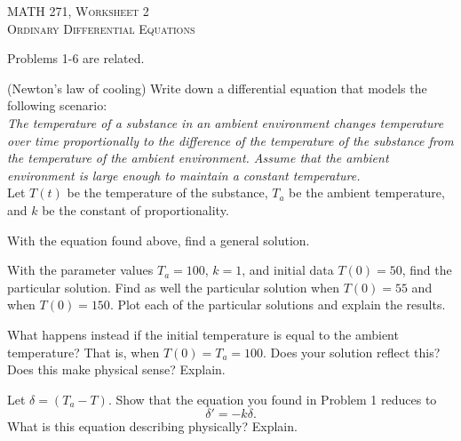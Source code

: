\documentclass[12pt]{article} %
\begin{document}
\begin{center}
   \textsc{\large MATH 271, Worksheet 2}\\
   \textsc{Ordinary Differential Equations}
\end{center}
\vspace{.5cm}

\begin{center}
    Problems 1-6 are related.
\end{center}

\begin{problem}
    (Newton's law of cooling) Write down a differential equation that models the following scenario:\\
    
    \noindent\emph{The temperature of a substance in an ambient environment changes temperature over time proportionally to the difference of the temperature of the substance from the temperature of the ambient environment. Assume that the ambient environment is large enough to maintain a constant temperature.}\\
    
    \noindent Let $T(t)$ be the temperature of the substance, $T_a$ be the ambient temperature, and $k$ be the constant of proportionality.
\end{problem}

\begin{problem}
    With the equation found above, find a general solution.
\end{problem}

\begin{problem}
    With the parameter values $T_a=100$, $k=1$, and initial data $T(0)=50$, find the particular solution.  Find as well the particular solution when $T(0)=55$ and when $T(0)=150$. Plot each of the particular solutions and explain the results.
\end{problem}


\begin{problem}
    What happens instead if the initial temperature is equal to the ambient temperature? That is, when $T(0)=T_a=100$. Does your solution reflect this? Does this make physical sense? Explain.
\end{problem}

\begin{problem}
    Let $\delta = (T_a-T)$. Show that the equation you found in Problem 1 reduces to
    \[
    \delta' = -k\delta.
    \]
    What is this equation describing physically? Explain.
\end{problem}
\end{document}
